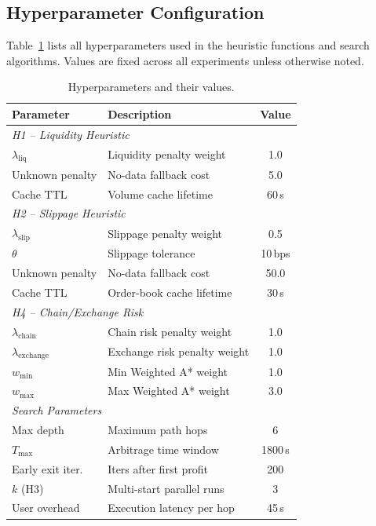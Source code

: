 \subsection{Hyperparameter Configuration}
\label{sec:hyperparams}

Table~\ref{tab:hyperparams} lists all hyperparameters used in the heuristic functions and search algorithms. Values are fixed across all experiments unless otherwise noted.

\begin{table}[h]
\centering
\small
\caption{Hyperparameters and their values.}
\label{tab:hyperparams}
\begin{tabular}{llc}
\toprule
\textbf{Parameter} & \textbf{Description} & \textbf{Value} \\
\midrule
\multicolumn{3}{l}{\textit{H1 -- Liquidity Heuristic}} \\
$\lambda_{\text{liq}}$ & Liquidity penalty weight & 1.0 \\
Unknown penalty & No-data fallback cost & 5.0 \\
Cache TTL & Volume cache lifetime & 60\,s \\
\midrule
\multicolumn{3}{l}{\textit{H2 -- Slippage Heuristic}} \\
$\lambda_{\text{slip}}$ & Slippage penalty weight & 0.5 \\
$\theta$ & Slippage tolerance & 10\,bps \\
Unknown penalty & No-data fallback cost & 50.0 \\
Cache TTL & Order-book cache lifetime & 30\,s \\
\midrule
\multicolumn{3}{l}{\textit{H4 -- Chain/Exchange Risk}} \\
$\lambda_{\text{chain}}$ & Chain risk penalty weight & 1.0 \\
$\lambda_{\text{exchange}}$ & Exchange risk penalty weight & 1.0 \\
$w_{\min}$ & Min Weighted A* weight & 1.0 \\
$w_{\max}$ & Max Weighted A* weight & 3.0 \\
\midrule
\multicolumn{3}{l}{\textit{Search Parameters}} \\
Max depth & Maximum path hops & 6 \\
$T_{\max}$ & Arbitrage time window & 1800\,s \\
Early exit iter. & Iters after first profit & 200 \\
$k$ (H3) & Multi-start parallel runs & 3 \\
User overhead & Execution latency per hop & 45\,s \\
\bottomrule
\end{tabular}
\end{table}

